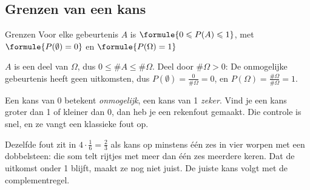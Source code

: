 \subsection{Grenzen van een kans}

\begin{theorie}
\begin{stelling}{Grenzen}
Voor elke gebeurtenis $A$ is \quad $\formule{0 \leqslant P(A) \leqslant 1}$, \quad met \quad $\formule{P(\emptyset) = 0}$ \quad en \quad $\formule{P(\Omega) = 1}$
\end{stelling}

\begin{bewijs}
$A$ is een deel van $\Omega$, dus $0 \leqslant \#A \leqslant \#\Omega$. Deel door $\#\Omega > 0$:
De onmogelijke gebeurtenis heeft geen uitkomsten, dus $P(\emptyset) = \frac{0}{\#\Omega} = 0$, en $P(\Omega) = \frac{\#\Omega}{\#\Omega} = 1$.
\end{bewijs}
\end{theorie}

Een kans van 0 betekent \textit{onmogelijk}, een kans van 1 \textit{zeker}. Vind je een kans groter dan 1 of kleiner dan 0, dan heb je een rekenfout gemaakt. Die controle is snel, en ze vangt een klassieke fout op.


Dezelfde fout zit in $4 \cdot \frac16 = \frac23$ als kans op minstens één zes in vier worpen met een dobbelsteen: die som telt rijtjes met meer dan één zes meerdere keren. Dat de uitkomst onder 1 blijft, maakt ze nog niet juist. De juiste kans volgt met de complementregel.


